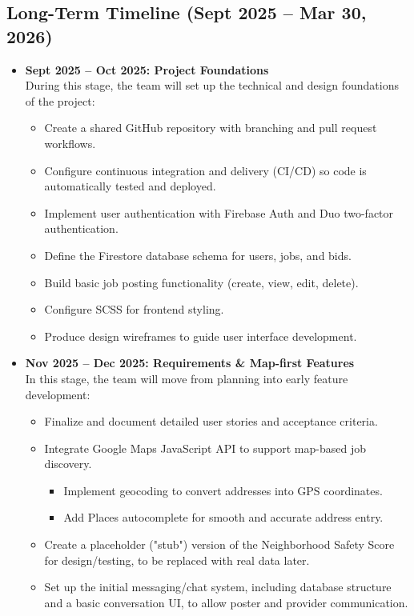 \documentclass[11pt]{article}
\begin{document}
\subsection*{Long-Term Timeline (Sept 2025 -- Mar 30, 2026)}
\begin{itemize}[leftmargin=1.4em]
  \item \textbf{Sept 2025 -- Oct 2025: Project Foundations} \\
  During this stage, the team will set up the technical and design foundations of the project:
  \begin{itemize}
    \item Create a shared GitHub repository with branching and pull request workflows.
    \item Configure continuous integration and delivery (CI/CD) so code is automatically tested and deployed.
    \item Implement user authentication with Firebase Auth and Duo two-factor authentication.
    \item Define the Firestore database schema for users, jobs, and bids.
    \item Build basic job posting functionality (create, view, edit, delete).
    \item Configure SCSS for frontend styling.
    \item Produce design wireframes to guide user interface development.
  \end{itemize}
  \item \textbf{Nov 2025 -- Dec 2025: Requirements \& Map-first Features} \\
  In this stage, the team will move from planning into early feature development:
  \begin{itemize}
    \item Finalize and document detailed user stories and acceptance criteria.
    \item Integrate Google Maps JavaScript API to support map-based job discovery.
      \begin{itemize}
        \item Implement geocoding to convert addresses into GPS coordinates.
        \item Add Places autocomplete for smooth and accurate address entry.
      \end{itemize}
    \item Create a placeholder ("stub") version of the Neighborhood Safety Score for design/testing, to be replaced with real data later.
    \item Set up the initial messaging/chat system, including database structure and a basic conversation UI, to allow poster and provider communication.

\end{itemize}
\end{itemize}
\end{document}
